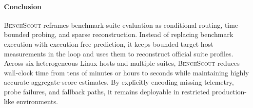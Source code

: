 \documentclass[sigplan,10pt, anonymous]{acmart}
\begin{document}
\paragraph{Conclusion}

\textsc{BenchScout} reframes benchmark-suite evaluation as conditional routing, time-bounded probing, and sparse reconstruction. Instead of replacing benchmark execution with execution-free prediction, it keeps bounded target-host measurements in the loop and uses them to reconstruct official suite profiles. Across six heterogeneous Linux hosts and multiple suites, \textsc{BenchScout} reduces wall-clock time from tens of minutes or hours to seconds while maintaining highly accurate aggregate-score estimates. By explicitly encoding missing telemetry, probe failures, and fallback paths, it remains deployable in restricted production-like environments.





\end{document}
